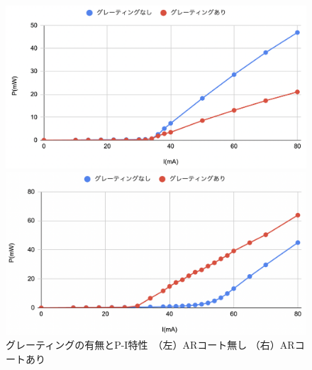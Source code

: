 \documentclass[dvipdfmx]{jsarticle}
\begin{document}
\begin{figure}[hbtp]
\centering
\begin{minipage}[b]{0.45\linewidth}
\includegraphics[width=1\textwidth]{images/ld_toptica.png}
\end{minipage}
\begin{minipage}[b]{0.45\linewidth}
\includegraphics[width=1\textwidth]{images/ld_nicha.png}
\end{minipage}
\caption{\label{fig:ar}グレーティングの有無とP-I特性　（左）ARコート無し （右）ARコートあり}
\end{figure}
\end{document}
